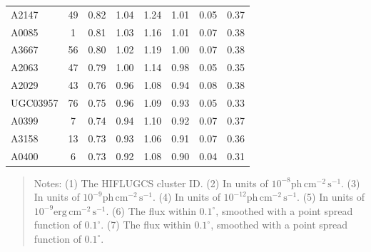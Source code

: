 \documentclass[10pt,aps,pra,reprint,amsmath,amsfonts,amssymb,showpacs,nofootinbib,floatfix]{revtex4-1}
\newcommand{\rmn}{\mathrm}
\begin{document}
\begin{table}
\begin{minipage}{2.0\columnwidth}
\begin{tabular}{l  c c c c c c c}
A2147    &  49 &   0.82 &   1.04 &   1.24 &   1.01 &   0.05 &   0.37 \\
A0085    &   1 &   0.81 &   1.03 &   1.16 &   1.01 &   0.07 &   0.38 \\
A3667    &  56 &   0.80 &   1.02 &   1.19 &   1.00 &   0.07 &   0.38 \\
A2063    &  47 &   0.79 &   1.00 &   1.14 &   0.98 &   0.05 &   0.35 \\
A2029    &  43 &   0.76 &   0.96 &   1.08 &   0.94 &   0.08 &   0.38 \\
UGC03957 &  76 &   0.75 &   0.96 &   1.09 &   0.93 &   0.05 &   0.33 \\
A0399    &   7 &   0.74 &   0.94 &   1.10 &   0.92 &   0.07 &   0.37 \\
A3158    &  13 &   0.73 &   0.93 &   1.06 &   0.91 &   0.07 &   0.36 \\
A0400    &   6 &   0.73 &   0.92 &   1.08 &   0.90 &   0.04 &   0.31 \\
\hline
\hline
\end{tabular}
\begin{quote}
  Notes: 
   (1) The HIFLUGCS cluster ID.
   (2) In units of  $10^{-8} \rmn{ph}\,\rmn{cm}^{-2}\,\rmn{s}^{-1}$.
   (3) In units of  $10^{-9} \rmn{ph}\,\rmn{cm}^{-2}\,\rmn{s}^{-1}$.
   (4) In units of  $10^{-12} \rmn{ph}\,\rmn{cm}^{-2}\,\rmn{s}^{-1}$.
   (5) In units of  $10^{-9} \rmn{erg}\,\rmn{cm}^{-2}\,\rmn{s}^{-1}$.
   (6) The flux within $0.1^\circ$, smoothed with a point spread function of $0.1^\circ$. 
   (7) The flux within $0.1^\circ$, smoothed with a point spread function of $0.1^\circ$. 
 \label{tab:flux_tab_LP}
  \end{quote}
\end{minipage}
\end{table} 
\end{document}
